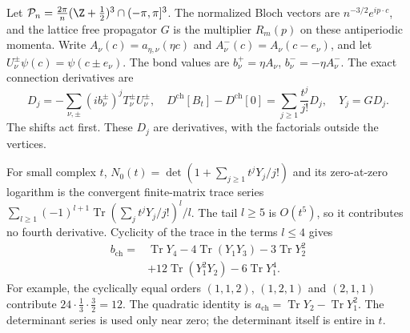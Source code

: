 \documentclass[11pt,letterpaper,reqno]{amsart}
\begin{document}
Let $\mathcal P_n=\frac{2\pi}{n}(\Z+\frac12)^3\cap(-\pi,\pi]^3$.
The normalized Bloch vectors are $n^{-3/2}e^{ip\cdot c}$,
and the lattice free propagator $G$ is the multiplier
$R_m(p)$ on these antiperiodic momenta. Write
$A_\nu(c)=a_{\eta,\nu}(\eta c)$ and
$A_\nu^-(c)=A_\nu(c-e_\nu)$, and let
$U_\nu^\pm\psi(c)=\psi(c\pm e_\nu)$. The bond values are
$b_\nu^+=\eta A_\nu$, $b_\nu^-=-\eta A_\nu^-$.
The exact connection derivatives are
\begin{equation}\label{eq:response-connection-derivatives}
 D_j=-\sum_{\nu,\pm}(ib_\nu^\pm)^jT_\nu^\pm U_\nu^\pm,
 \quad D^{\mathrm{ch}}[B_t]-D^{\mathrm{ch}}[0]
                  =\sum_{j\ge1}\frac{t^j}{j!}D_j,
 \quad Y_j=GD_j.
\end{equation}
The shifts act first. These $D_j$ are derivatives, with
the factorials outside the vertices.

For small complex $t$, $N_0(t)=\det(1+\sum_{j\ge1}t^jY_j/j!)$
and its zero-at-zero logarithm is the convergent finite-matrix
trace series $\sum_{l\ge1}(-1)^{l+1}\operatorname{Tr}(\sum_j
t^jY_j/j!)^l/l$. The tail $l\ge5$ is $O(t^5)$, so it
contributes no fourth derivative. Cyclicity of the trace
in the terms $l\le4$ gives
\begin{equation}\label{eq:response-fourth-identity}
 \begin{split}
 b_{\mathrm{ch}}={}&\operatorname{Tr}Y_4
       -4\operatorname{Tr}(Y_1Y_3)-3\operatorname{Tr}Y_2^2\\
       &+12\operatorname{Tr}(Y_1^2Y_2)-6\operatorname{Tr}Y_1^4.
 \end{split}
\end{equation}
For example, the cyclically equal orders $(1,1,2)$,
$(1,2,1)$ and $(2,1,1)$ contribute
$24\cdot\frac13\cdot\frac32=12$. The quadratic identity
is $a_{\mathrm{ch}}=\operatorname{Tr}Y_2-\operatorname{Tr}Y_1^2$.
The determinant series is used only near zero; the determinant
itself is entire in $t$.
\end{document}
